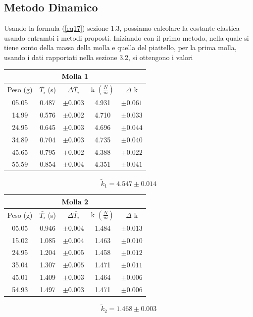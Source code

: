 \documentclass[a4paper]{article}
\begin{document}
{\subsection{Metodo Dinamico}
Usando la formula (\ref{eq17}) sezione 1.3, possiamo calcolare la costante elastica usando entrambi i metodi proposti. Iniziando con il primo metodo, nella quale si tiene conto della massa della molla e quella del piattello, per la prima molla, usando i dati rapportati nella sezione 3.2, si ottengono i valori
\FloatBarrier
\begin{table}[!h]
    \centering
\begin{tabular}{|c|c|c|c|c|}
    \hline
    \multicolumn{5}{|c|}{Molla 1} \\
    \hline
    Peso (g) & $\bar{T_i}$ (s) & $\Delta \bar{T_i}$ & k $(\frac{N}{m})$ & $\Delta$ k \\
    \hline
    05.05 & 0.487 & $\pm{0.003}$ & 4.931 & $\pm{0.061}$ \\
    14.99 & 0.576 & $\pm{0.002}$ & 4.710 & $\pm{0.033}$ \\
    24.95 & 0.645 & $\pm{0.003}$ & 4.696 & $\pm{0.044}$ \\
    34.89 & 0.704 & $\pm{0.003}$ & 4.735 & $\pm{0.040}$ \\
    45.65 & 0.795 & $\pm{0.002}$ & 4.388 & $\pm{0.022}$ \\
    55.59 & 0.854 & $\pm{0.004}$ & 4.351 & $\pm{0.041}$ \\
    \hline
\end{tabular}
\end{table}
\FloatBarrier

\begin{equation}
    \tilde{k}_1 = 4.547\pm{0.014}
\end{equation}

\begin{table}[!h]
    \centering
\begin{tabular}{|c|c|c|c|c|}
    \hline
    \multicolumn{5}{|c|}{Molla 2} \\
    \hline
    Peso (g) & $\bar{T_i}$ (s) & $\Delta \bar{T_i}$ & k $(\frac{N}{m})$ & $\Delta$ k \\
    \hline
    05.05 & 0.946 & $\pm{0.004}$ & 1.484 & $\pm{0.013}$ \\
    15.02 & 1.085 & $\pm{0.004}$ & 1.463 & $\pm{0.010}$ \\
    24.95 & 1.204 & $\pm{0.005}$ & 1.458 & $\pm{0.012}$ \\
    35.04 & 1.307 & $\pm{0.005}$ & 1.471 & $\pm{0.011}$ \\
    45.01 & 1.409 & $\pm{0.003}$ & 1.464 & $\pm{0.006}$ \\
    54.93 & 1.497 & $\pm{0.003}$ & 1.471 & $\pm{0.006}$ \\
    \hline
\end{tabular}
\end{table}
\FloatBarrier
{}
\begin{equation}
    \tilde{k}_2 = 1.468\pm{0.003}
\end{equation}

}
\end{document}
